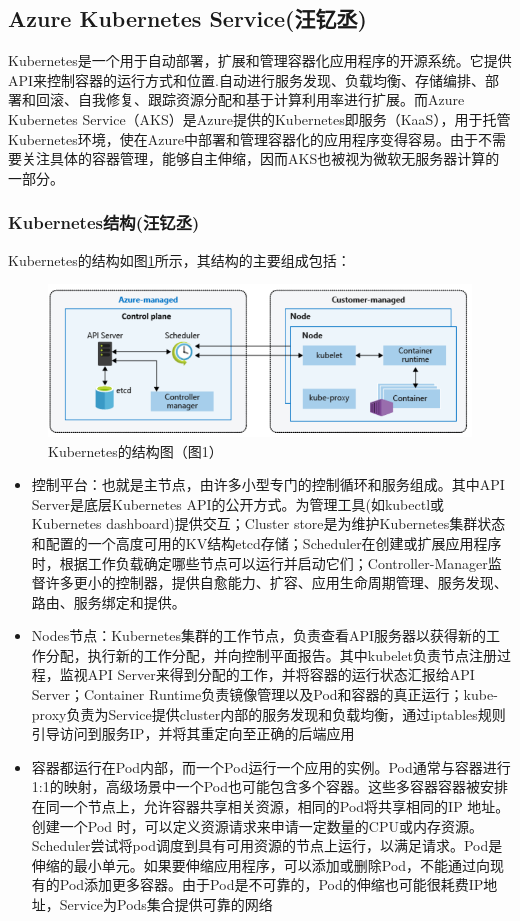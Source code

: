 \documentclass[11pt]{article}
\begin{document}
\subsection{Azure Kubernetes Service(汪钇丞)}
Kubernetes是一个用于自动部署，扩展和管理容器化应用程序的开源系统。它提供API来控制容器的运行方式和位置.自动进行服务发现、负载均衡、存储编排、部署和回滚、自我修复、跟踪资源分配和基于计算利用率进行扩展。而Azure Kubernetes Service（AKS）是Azure提供的Kubernetes即服务（KaaS），用于托管Kubernetes环境，使在Azure中部署和管理容器化的应用程序变得容易。由于不需要关注具体的容器管理，能够自主伸缩，因而AKS也被视为微软无服务器计算的一部分。
\subsubsection{Kubernetes结构(汪钇丞)}
Kubernetes的结构如图\ref{figs:Structure}所示，其结构的主要组成包括：
\begin{figure}[!htbp]
	\centering
	\includegraphics[scale=0.5]{figs/Kubernetes}
	\caption{Kubernetes的结构图（\cite{Kubernetes}图1）}
	\label{figs:Structure}
\end{figure}
\begin{itemize}
	\setlength{\itemsep}{0pt}
	\setlength{\parsep}{0pt}
	\setlength{\parskip}{0pt}
	\item 控制平台：也就是主节点，由许多小型专门的控制循环和服务组成。其中API Server是底层Kubernetes API的公开方式。为管理工具(如kubectl或Kubernetes dashboard)提供交互；Cluster store是为维护Kubernetes集群状态和配置的一个高度可用的KV结构etcd存储；Scheduler在创建或扩展应用程序时，根据工作负载确定哪些节点可以运行并启动它们；Controller-Manager监督许多更小的控制器，提供自愈能力、扩容、应用生命周期管理、服务发现、路由、服务绑定和提供。
	\item Nodes节点：Kubernetes集群的工作节点，负责查看API服务器以获得新的工作分配，执行新的工作分配，并向控制平面报告。其中kubelet负责节点注册过程，监视API Server来得到分配的工作，并将容器的运行状态汇报给API Server；Container Runtime负责镜像管理以及Pod和容器的真正运行；kube-proxy负责为Service提供cluster内部的服务发现和负载均衡，通过iptables规则引导访问到服务IP，并将其重定向至正确的后端应用
	\item 容器都运行在Pod内部，而一个Pod运行一个应用的实例。Pod通常与容器进行1:1的映射，高级场景中一个Pod也可能包含多个容器。这些多容器容器被安排在同一个节点上，允许容器共享相关资源，相同的Pod将共享相同的IP 地址。创建一个Pod 时，可以定义资源请求来申请一定数量的CPU或内存资源。Scheduler尝试将pod调度到具有可用资源的节点上运行，以满足请求。Pod是伸缩的最小单元。如果要伸缩应用程序，可以添加或删除Pod，不能通过向现有的Pod添加更多容器。由于Pod是不可靠的，Pod的伸缩也可能很耗费IP地址，Service为Pods集合提供可靠的网络
\end{itemize}
\end{document}
